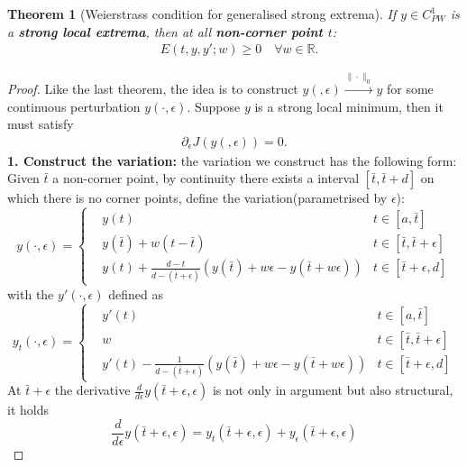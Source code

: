 \documentclass[a4paper,11pt,fleqn]{book}
\newtheorem{theorem}{Theorem}[section]
\theoremstyle{definition}
\theoremstyle{remark}
\begin{document}
\begin{theorem}[Weierstrass condition for generalised strong extrema]If $y \in C_{PW}^1$ is a \textbf{strong local extrema}, then at all \textbf{non-corner point $t$}:
	\begin{equation}
	\begin{aligned}
		& E(t, y, y'; w) \ge 0 \quad \forall w \in \mathbb{R}. 
	\end{aligned}
	\end{equation}
\end{theorem}
\begin{proof}
Like the last theorem, the idea is to construct $y(, \epsilon) \overset{\|\cdot\|_0}{\longrightarrow} y$ for some continuous perturbation $y(\cdot, \epsilon)$. Suppose $y$ is a strong local minimum, then it must satisfy
\begin{align*}
	\partial_\epsilon J(y(, \epsilon)) = 0.
\end{align*}
\textbf{1. Construct the variation:}
the variation we construct has the following form: Given $\bar{t}$ a non-corner point, by continuity there exists a interval $[\bar{t}, \bar{t} + d]$ on which there is no corner points, define the variation(parametrised by $\epsilon$):
\begin{equation*}
	y(\cdot, \epsilon) = 
	\left\{
	\begin{aligned}
		& y(t)  & t \in [a, \bar{t}] \\
		& y(\bar{t}) + w (t - \bar{t}) & t \in [\bar{t}, \bar{t} + \epsilon]\\
		& y(t) + \frac{d - t}{d - (\bar{t} + \epsilon)}(y(\bar{t}) + w \epsilon - y(\bar{t} + w \epsilon)) & t \in [\bar{t} + \epsilon, d]
	\end{aligned}
	\right.
\end{equation*}
with the $y'(\cdot, \epsilon)$ defined as
\begin{equation*}
	y_t(\cdot, \epsilon) = 
	\left\{
	\begin{aligned}
		& y'(t)  & t \in [a, \bar{t}] \\
		& w  & t \in [\bar{t}, \bar{t} + \epsilon]\\
		& y'(t) - \frac{1}{d - (\bar{t} + \epsilon)}(y(\bar{t}) + w \epsilon - y(\bar{t} + w \epsilon)) & t \in [\bar{t} + \epsilon, d]
	\end{aligned}
	\right.
\end{equation*}
At $\bar{t} + \epsilon$ the derivative $\frac{d}{d\epsilon} y( \bar{t} + \epsilon, \epsilon)$ is not only in argument but also structural, it holds
\begin{equation}
	\frac{d}{d\epsilon}y(\bar{t} + \epsilon, \epsilon) = y_t(\bar{t}+ \epsilon, \epsilon) + y_\epsilon(\bar{t} + \epsilon, \epsilon)
\end{equation}



\end{proof}
\end{document}
